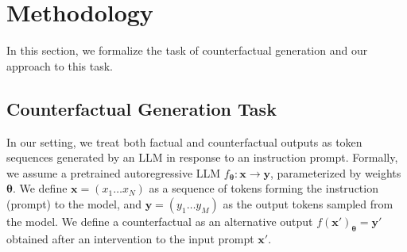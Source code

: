 \documentclass[11pt]{article}
\newcommand{\al}[1]{\textcolor{blue}{\bf [Alex: #1]}}
\begin{document}


\section{Methodology}
In this section, we formalize the task of counterfactual generation and our approach to this task. 

\subsection{Counterfactual Generation Task}
In our setting, we treat both factual and counterfactual outputs as token sequences generated by an LLM in response to an instruction prompt. Formally, we assume a pretrained autoregressive LLM $f_{\mathbf{\theta}}: \mathbf{x} \rightarrow \mathbf{y}$, parameterized by weights $\mathbf{\theta}$. We define $\mathbf{x}={( x_1 \dots x_N)}$ as a sequence of tokens forming the instruction (prompt) to the model, and $\mathbf{y}={( y_1 \dots y_M)}$ as the output tokens sampled from the model. We define a counterfactual as an alternative output $f(\mathbf{x'})_{\mathbf{\theta}}=\mathbf{y}'$ obtained after an intervention to the input prompt $\mathbf{x}'$. 
\end{document}
